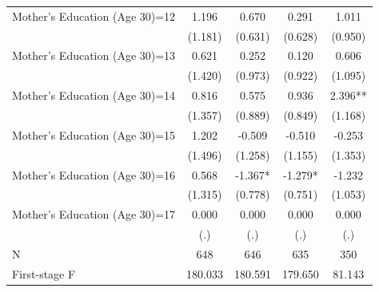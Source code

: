 \begin{table}[ht!]
{\begin{tabular}{l*{4}{c}}
Mother's Education (Age 30)=12&       1.196   &       0.670   &       0.291   &       1.011   \\
                    &     (1.181)   &     (0.631)   &     (0.628)   &     (0.950)   \\
Mother's Education (Age 30)=13&       0.621   &       0.252   &       0.120   &       0.606   \\
                    &     (1.420)   &     (0.973)   &     (0.922)   &     (1.095)   \\
Mother's Education (Age 30)=14&       0.816   &       0.575   &       0.936   &       2.396** \\
                    &     (1.357)   &     (0.889)   &     (0.849)   &     (1.168)   \\
Mother's Education (Age 30)=15&       1.202   &      -0.509   &      -0.510   &      -0.253   \\
                    &     (1.496)   &     (1.258)   &     (1.155)   &     (1.353)   \\
Mother's Education (Age 30)=16&       0.568   &      -1.367*  &      -1.279*  &      -1.232   \\
                    &     (1.315)   &     (0.778)   &     (0.751)   &     (1.053)   \\
Mother's Education (Age 30)=17&       0.000   &       0.000   &       0.000   &       0.000   \\
                    &         (.)   &         (.)   &         (.)   &         (.)   \\
\midrule
N                   &         648   &         646   &         635   &         350   \\
First-stage F       &     180.033   &     180.591   &     179.650   &      81.143   \\
\bottomrule \end{tabular}}
\vspace{0.2cm} 
\end{table}
